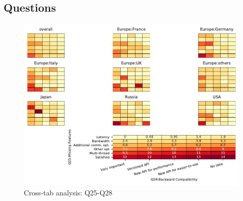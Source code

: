 
\subsection{Questions}


\begin{figure}
\begin{center}
\includegraphics[width=12cm]{../pdfs/Q25-Q28.pdf}
\caption{Cross-tab analysis: Q25-Q28}
\label{fig:Q25-Q28}
\end{center}
\end{figure}
